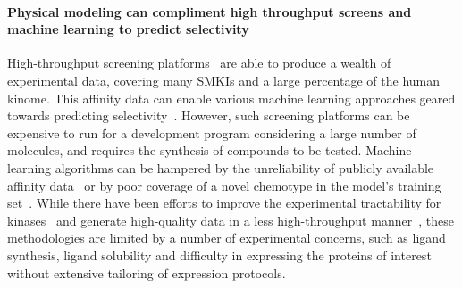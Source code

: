 \documentclass[9pt,lineno]{elife-modified} %
\begin{document}
\paragraph{Physical modeling can compliment high throughput screens and machine learning to predict selectivity}
High-throughput screening platforms~\citep{Davis:Nat.Biotechnol.:2011,Drewry2017-bd,Cheng2010-ip,Uitdehaag2012-nm,Klaeger2017-jr,Vasta:2018gy} are able to produce a wealth of experimental data, covering many SMKIs and a large percentage of the human kinome. This affinity data can enable various machine learning approaches geared towards predicting selectivity~\citep{Merget2017-sv,Volkamer2016-sj,ChristmannFranck:2016gka,Gao:2013jx}. However, such screening platforms can be expensive to run for a development program considering a large number of molecules, and requires the synthesis of compounds to be tested. Machine learning algorithms can be hampered by the unreliability of publicly available affinity data~\citep{Kramer:J.Med.Chem.:2012,BROWN2009420} or by poor coverage of a novel chemotype in the model's training set~\citep{Drewry2017-bd}. While there have been efforts to improve the experimental tractability for kinases~\citep{Albanese:2018hq,Seeliger:2005ic,sgc-kinome,Chambers:2004jc} and generate high-quality data in a less high-throughput manner~\citep{Seeliger2007-jn,Levinson:PLoSBiol.:2006}, these methodologies are limited by a number of experimental concerns, such as ligand synthesis, ligand solubility and difficulty in expressing the proteins of interest without extensive tailoring of expression protocols. 
\end{document}
